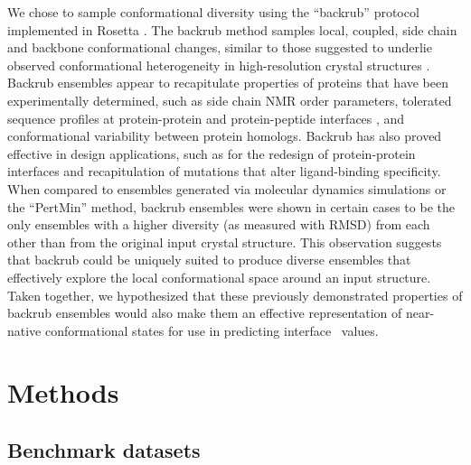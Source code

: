 We chose to sample conformational diversity using the ``backrub'' protocol implemented in Rosetta \cite{smith_backrub-like_2008}.
The backrub method samples local, coupled, side chain and backbone conformational changes, similar to those suggested to underlie observed conformational heterogeneity in high-resolution crystal structures \cite{davis_backrub_2006}.
Backrub ensembles appear to recapitulate properties of proteins that have been experimentally determined, such as side chain NMR order parameters\cite{friedland_simple_2008}, tolerated sequence profiles at protein-protein \cite{humphris_prediction_2008} and protein-peptide interfaces \cite{smith_structure-based_2010,smith_predicting_2011}, and conformational variability between protein homologs\cite{schenkelberg_protein_2016}.
Backrub has also proved effective in design applications, such as for the redesign of protein-protein interfaces\cite{kapp_control_2012} and recapitulation of mutations that alter ligand-binding specificity\cite{ollikainen_coupling_2015}.
When compared to ensembles generated via molecular dynamics simulations or the ``PertMin'' method\cite{davey_improving_2014}, backrub ensembles were shown in certain cases to be
the only ensembles with a higher diversity (as measured with RMSD) from each other than from the original input crystal structure. This observation suggests that backrub could be uniquely suited to produce diverse ensembles that effectively explore the local conformational space around an input structure.\cite{davey_improving_2014}
Taken together, we hypothesized that these previously demonstrated properties of backrub ensembles would also make them an effective representation of near-native conformational states for use in predicting interface \ddg\ values.

\section{Methods}

\subsection{Benchmark datasets}

